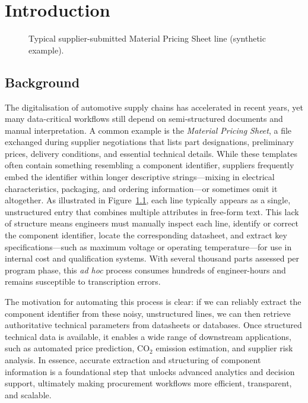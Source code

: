 \chapter{Introduction}\label{chapter:introduction}

\begin{figure}[H]
  \centering
  \caption{Typical supplier-submitted Material Pricing Sheet line (synthetic example).}
  \label{fig:standardised-quotation-analysis-template-line-example}
\end{figure}

\section{Background }
The digitalisation of automotive supply chains has accelerated in recent years, yet many data-critical workflows still depend on semi-structured documents and manual interpretation.  
A common example is the \emph{Material Pricing Sheet}, a file exchanged during supplier negotiations that lists part designations, preliminary prices, delivery conditions, and essential technical details.  
While these templates often contain something resembling a component identifier, suppliers frequently embed the identifier within longer descriptive strings—mixing in electrical characteristics, packaging, and ordering information—or sometimes omit it altogether.  
As illustrated in Figure~\ref{fig:standardised-quotation-analysis-template-line-example}, each line typically appears as a single, unstructured entry that combines multiple attributes in free-form text.  
This lack of structure means engineers must manually inspect each line, identify or correct the component identifier, locate the corresponding datasheet, and extract key specifications—such as maximum voltage or operating temperature—for use in internal cost and qualification systems.  
With several thousand parts assessed per program phase, this \emph{ad hoc} process consumes hundreds of engineer-hours and remains susceptible to transcription errors.

The motivation for automating this process is clear: if we can reliably extract the component identifier from these noisy, unstructured lines, we can then retrieve authoritative technical parameters from datasheets or databases. Once structured technical data is available, it enables a wide range of downstream applications, such as automated price prediction, CO$_2$ emission estimation, and supplier risk analysis. In essence, accurate extraction and structuring of component information is a foundational step that unlocks advanced analytics and decision support, ultimately making procurement workflows more efficient, transparent, and scalable.

